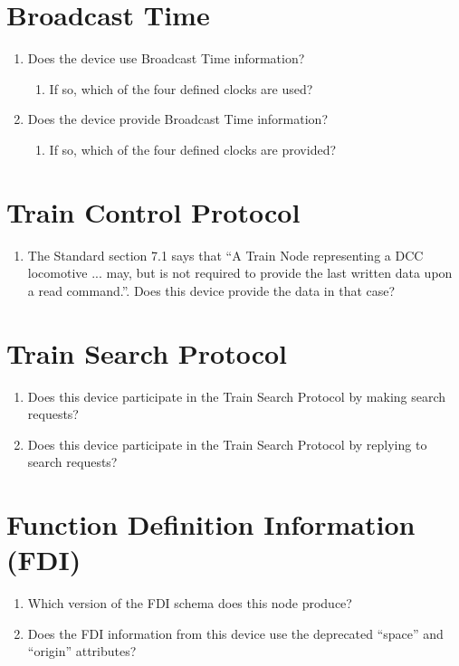 \section{Broadcast Time}
    \begin{enumerate}
        \item Does the device use Broadcast Time information?
            \begin{enumerate}
                \item If so, which of the four defined clocks are used?
            \end{enumerate}
        \item Does the device provide Broadcast Time information?
            \begin{enumerate}
                \item If so, which of the four defined clocks are provided?
            \end{enumerate}
        
    \end{enumerate}

\section{Train Control Protocol}
    \begin{enumerate}
        \item The Standard section 7.1 says that
            ``A Train Node representing a DCC locomotive ... may, 
            but is not required to provide the last written data upon a read command.''.
            Does this device provide the data in that case?
    \end{enumerate}

\section{Train Search Protocol}
    \begin{enumerate}
        \item Does this device participate in the Train Search Protocol
            by making search requests?
        \item Does this device participate in the Train Search Protocol
            by replying to search requests?
    \end{enumerate}

\section{Function Definition Information (FDI)}
    \begin{enumerate}
        \item Which version of the FDI schema does this node produce?
        \item Does the FDI information from this device use the 
            deprecated ``space'' and ``origin'' attributes?
    \end{enumerate}


  
